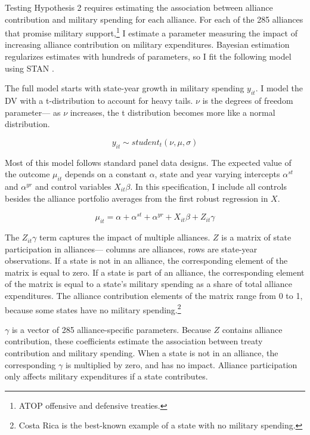\documentclass[12pt]{article}
\begin{document}
Testing Hypothesis 2 requires estimating the association between alliance contribution and military spending for each alliance.
For each of the 285 alliances that promise military support,\footnote{ATOP offensive and defensive treaties.} I estimate a parameter measuring the impact of increasing alliance contribution on military expenditures. 
Bayesian estimation regularizes estimates with hundreds of parameters, so I fit the following model using STAN \citep{Carpenteretal2016}.

The full model starts with state-year growth in military spending $y_{it}$.
I model the DV with a t-distribution to account for heavy tails.
$\nu$ is the degrees of freedom parameter--- as $\nu$ increases, the t distribution becomes more like a normal distribution. 


\begin{equation}
y_{it} \sim student_t(\nu, \mu, \sigma) 
\end{equation}


Most of this model follows standard panel data designs.
The expected value of the outcome $\mu_{it}$ depends on a constant $\alpha$, state and year varying intercepts $\alpha^{st}$ and $\alpha^{yr}$ and control variables $X_{it} \beta$. 
In this specification, I include all controls besides the alliance portfolio averages from the first robust regression in $X$.


\begin{equation}
\mu_{it} = \alpha + \alpha^{st} + \alpha^{yr} + X_{it} \beta + Z_{it} \gamma 
\end{equation}


The $Z_{it} \gamma$ term captures the impact of multiple alliances. 
\textbf{$Z$} is a matrix of state participation in alliances--- columns are alliances, rows are state-year observations. 
If a state is not in an alliance, the corresponding element of the matrix is equal to zero. 
If a state is part of an alliance, the corresponding element of the matrix is equal to a state's military spending as a share of total alliance expenditures. 
The alliance contribution elements of the matrix range from 0 to 1, because some states have no military spending.\footnote{Costa Rica is the best-known example of a state with no military spending.} 


$\gamma$ is a vector of 285 alliance-specific parameters.  
Because $Z$ contains alliance contribution, these coefficients estimate the association between treaty contribution and military spending. 
When a state is not in an alliance, the corresponding $\gamma$ is multiplied by zero, and has no impact. 
Alliance participation only affects military expenditures if a state contributes. 
\end{document}
